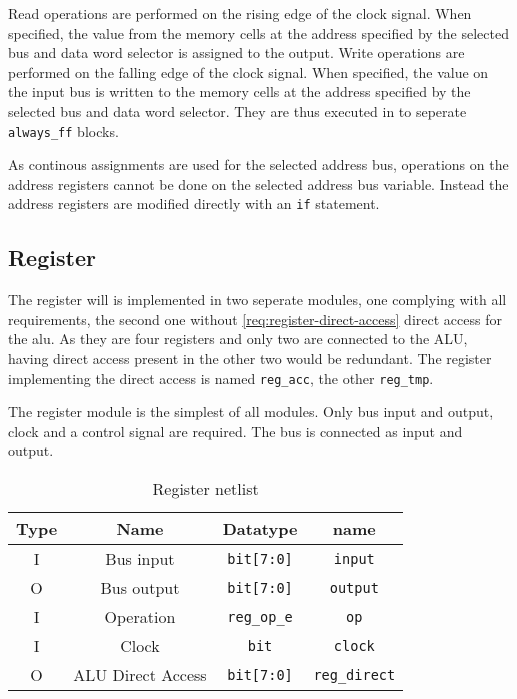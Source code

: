 Read operations are performed on the rising edge of the clock signal. When specified, the value from the memory cells at the address specified by the selected bus and data word selector is assigned to the output. Write operations are performed on the falling edge of the clock signal. When specified, the value on the input bus is written to the memory cells at the address specified by the selected bus and data word selector. They are thus executed in to seperate \texttt{always\_ff} blocks.

As continous assignments are used for the selected address bus, operations on the address registers cannot be done on the selected address bus variable. Instead the address registers are modified directly with an \texttt{if} statement.


\subsection{Register}
The register will is implemented in two seperate modules, one complying with all requirements, the second one without \ref{req:register-direct-access} direct access for the alu. As they are four registers and only two are connected to the ALU, having direct access present in the other two would be redundant. The register implementing the direct access is named \texttt{reg\_acc}, the other \texttt{reg\_tmp}.

The register module is the simplest of all modules. Only bus input and output, clock and a control signal are required. The bus is connected as input and output.

\begin{table}[H]
  
  \begin{center}
  \begin{tabular}{cccc}
   Type & Name               & Datatype                       & name                          \\ \hline
   I    & Bus input          & \texttt{bit{[}7:0{]}}          & \texttt{input}                \\
   O    & Bus output         & \texttt{bit{[}7:0{]}}          & \texttt{output}               \\
   I    & Operation          & \texttt{reg\_op\_e}         & \texttt{op}                   \\
   I    & Clock              & \texttt{bit}                   & \texttt{clock}               \\
   O    & ALU Direct Access               & \texttt{bit{[}7:0{]}}          & \texttt{reg\_direct}               \\
   \end{tabular}
  \end{center}
   \caption{Register netlist}
   \label{tab:reg-io}
\end{table}

